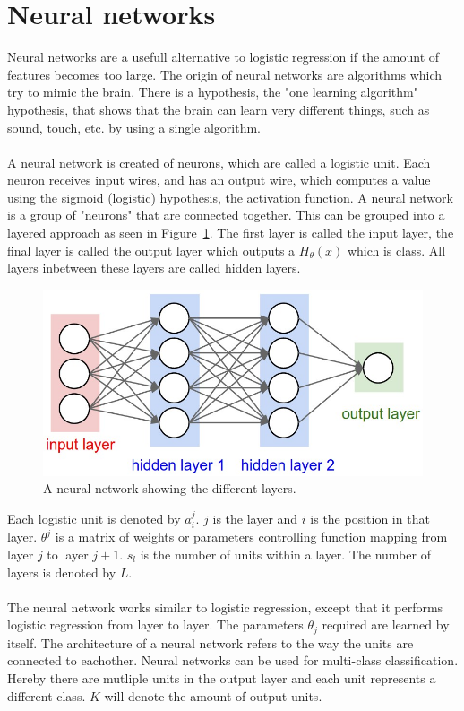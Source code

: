 \section{Neural networks}
Neural networks are a usefull alternative to logistic regression if the amount of features becomes too large. The origin of neural networks are algorithms which try to mimic the brain. There is a hypothesis, the "one learning algorithm" hypothesis, that shows that the brain can learn very different things, such as sound, touch, etc. by using a single algorithm. \\\\
A neural network is created of neurons, which are called a logistic unit. Each neuron receives input wires, and has an output wire, which computes a value using the sigmoid (logistic) hypothesis, the activation function. A neural network is a group of "neurons" that are connected together. This can be grouped into a layered approach as seen in Figure~\ref{fig:neuralnetwork}. The first layer is called the input layer, the final layer is called the output layer which outputs a $H_\theta(x)$ which is class. All layers inbetween these layers are called hidden layers.
\begin{figure}[H]
\centering
\includegraphics[width=1\textwidth]{Figures/neuralnet}
\decoRule
\caption[Neural network]{A neural network showing the different layers.}
\label{fig:neuralnetwork}
\end{figure}
\noindent Each logistic unit is denoted by $a_i^j$. $j$ is the layer and $i$ is the position in that layer. $\theta^j$ is a matrix of weights or parameters controlling function mapping from layer $j$ to layer $j+1$. $s_l$ is the number of units within a layer. The number of layers is denoted by $L$.\\\\The neural network works similar to logistic regression, except that it performs logistic regression from layer to layer. The parameters $\theta_j$ required are learned by itself. The architecture of a neural network refers to the way the units are connected to eachother. Neural networks can be used for multi-class classification. Hereby there are mutliple units in the output layer and each unit represents a different class. $K$ will denote the amount of output units.
